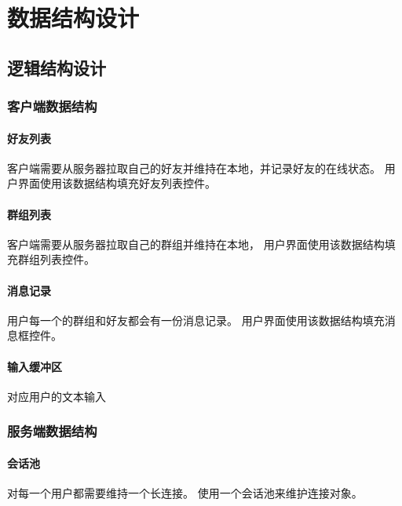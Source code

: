 \chapter{数据结构设计}
\section{逻辑结构设计}

\subsection{客户端数据结构}

\subsubsection{好友列表}
客户端需要从服务器拉取自己的好友并维持在本地，并记录好友的在线状态。
用户界面使用该数据结构填充好友列表控件。

\subsubsection{群组列表}
客户端需要从服务器拉取自己的群组并维持在本地，
用户界面使用该数据结构填充群组列表控件。

\subsubsection{消息记录}
用户每一个的群组和好友都会有一份消息记录。
用户界面使用该数据结构填充消息框控件。

\subsubsection{输入缓冲区}
对应用户的文本输入

\subsection{服务端数据结构}

\subsubsection{会话池}
对每一个用户都需要维持一个长连接。
使用一个会话池来维护连接对象。

